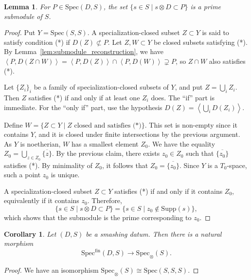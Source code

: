 \documentclass[11pt]{amsart}
\theoremstyle{definition}
\theoremstyle{plain}
\newtheorem{lem}[defn]{Lemma}
\newtheorem{cor}[defn]{Corollary}
\theoremstyle{remark}
\newcommand{\Spec}{\mathrm{Spec}}
\newcommand{\ol}{\overline}
\newcommand{\Supp}{\mathrm{Supp}}
\newcommand{\ang}[1]{{\left\langle{#1}\right\rangle}}
\newcommand{\oSpec}{\mathrm{Spec}_{\otimes}}
\newcommand{\fSpec}{{\mathrm{Spec}^{\mathrm{fin}}}}
\numberwithin{equation}{section}
\begin{document}
\begin{lem}\label{lem:base_prime_submodule}
  For \(P\in \Spec(D,S)\), the set \(\{s\in S\mid s\otimes D\subset P\}\) is a prime submodule of \(S\).
\end{lem}
\begin{proof}
  Put \(Y=\Spec(S,S)\).  
A specialization-closed subset \(Z\subset Y\) is said to satisfy condition (*) if \(D(Z)\not\subset P\).  
Let \(Z,W\subset Y\) be closed subsets satisfying (*).  
By Lemma~\ref{lem:submodule_reconstruction}, we have \(\ang{P,D(Z\cap W)}=\ang{P,D(Z)}\cap \ang{P,D(W)} \supsetneq P\), so \(Z\cap W\) also satisfies (*).


  Let \(\{Z_i\}_i\) be a family of specialization-closed subsets of \(Y\), and put \(Z=\bigcup_i Z_i\).
  Then \(Z\) satisfies (*) if and only if at least one \(Z_i\) does.
  The “if” part is immediate.
  For the “only if” part, use the hypothesis \(D(Z)=\ang{\bigcup_i D(Z_i)}\).

  Define \(W=\{Z\subset Y \mid Z \text{ closed and satisfies (*)}\}\).
  This set is non-empty since it contains \(Y\), and it is closed under finite intersections by the previous argument.
  As \(Y\) is noetherian, \(W\) has a smallest element \(Z_0\).
  We have the equality \(Z_0=\bigcup_{z\in Z_0}\ol{\{z\}}\).
  By the previous claim, there exists \(z_0\in Z_0\) such that \(\ol{\{z_0\}}\) satisfies (*).
  By minimality of \(Z_0\), it follows that \(Z_0=\ol{\{z_0\}}\).
  Since \(Y\) is a \(T_0\)-space, such a point \(z_0\) is unique.

  A specialization-closed subset \(Z\subset Y\) satisfies (*) if and only if it contains \(Z_0\), equivalently if it contains \(z_0\).
  Therefore,
  \[
  \{s\in S\mid s\otimes D\subset P\}
  =\{s\in S\mid z_0\not\in \Supp(s)\},
  \]
  which shows that the submodule is the prime corresponding to \(z_0\).
\end{proof}

\begin{cor}
Let \((D,S)\) be a smashing datum.
Then there is a natural morphism 
\[
\fSpec(D,S)\to \oSpec(S).
\]
\end{cor}
\begin{proof}
We have an isomorphism \(\oSpec(S)\cong \Spec(S,S,S)\).
\end{proof}
\end{document}
